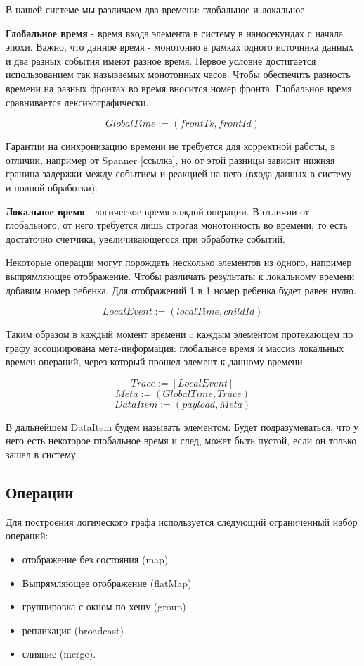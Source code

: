 \documentclass[14pt]{matmex-diploma-custom}
\begin{document}
В нашей системе мы различаем два времени: глобальное и локальное.

\textbf{Глобальное время} - время входа элемента в систему в наносекундах с начала эпохи. Важно, что данное время - монотонно в рамках одного источника данных и два разных события имеют разное время. Первое условие достигается использованием так называемых монотонных часов. Чтобы обеспечить разность времени на разных фронтах во время вносится номер фронта. Глобальное время сравнивается лексикографически.

\[GlobalTime := (frontTs, frontId)\]

Гарантии на синхронизацию времени не требуется для корректной работы, в отличии, например от Spanner [ссылка], но от этой разницы зависит нижняя граница задержки между событием и реакцией на него (входа данных в систему и полной обработки).

\textbf{Локальное время} - логическое время каждой операции. В отличии от глобального, от него требуется лишь строгая монотонность во времени, то есть достаточно счетчика, увеличивающегося при обработке событий.

Некоторые операции могут порождать несколько элементов из одного, например  выпрямляющее отображение. Чтобы различать результаты к локальному времени добавим номер ребенка. Для отображений 1 в 1 номер ребенка будет равен нулю.

\[LocalEvent := (localTime, childId)\]


Таким образом в каждый момент времени c каждым элементом протекающем по графу ассоциирована мета-информация: глобальное время и массив локальных времен операций, через который прошел элемент к данному времени.

\[Trace := [LocalEvent]\]
\[Meta := (GlobalTime, Trace)\]
\[DataItem := (payload, Meta)\]


В дальнейшем DataItem будем называть элементом. Будет подразумеваться, что у него есть некоторое глобальное время и след, может быть пустой, если он только зашел в систему.

\subsection{Операции}

Для построения логического графа используется следующий ограниченный набор операций:

\begin{itemize}
  \item отображение без состояния (map)
  \item Выпрямляющее отображение (flatMap)
  \item группировка с окном по хешу (group)
  \item репликация (broadcast)
  \item слияние (merge).
\end{itemize}
\end{document}
